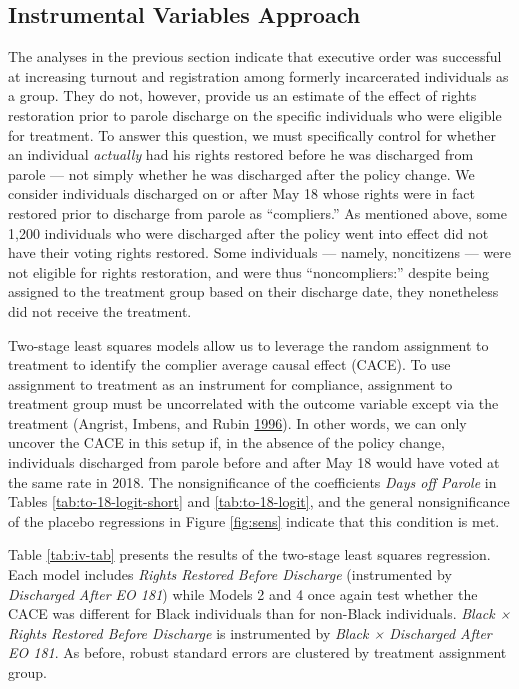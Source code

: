\documentclass[
  12pt,
]{article}
\begin{document}
\hypertarget{instrumental-variables-approach}{%
\subsection*{Instrumental Variables Approach}\label{instrumental-variables-approach}}

The analyses in the previous section indicate that executive order was successful at increasing turnout and registration among formerly incarcerated individuals as a group. They do not, however, provide us an estimate of the effect of rights restoration prior to parole discharge on the specific individuals who were eligible for treatment. To answer this question, we must specifically control for whether an individual \emph{actually} had his rights restored before he was discharged from parole --- not simply whether he was discharged after the policy change. We consider individuals discharged on or after May 18 whose rights were in fact restored prior to discharge from parole as ``compliers.'' As mentioned above, some 1,200 individuals who were discharged after the policy went into effect did not have their voting rights restored. Some individuals --- namely, noncitizens --- were not eligible for rights restoration, and were thus ``noncompliers:'' despite being assigned to the treatment group based on their discharge date, they nonetheless did not receive the treatment.

Two-stage least squares models allow us to leverage the random assignment to treatment to identify the complier average causal effect (CACE). To use assignment to treatment as an instrument for compliance, assignment to treatment group must be uncorrelated with the outcome variable except via the treatment (Angrist, Imbens, and Rubin \protect\hyperlink{ref-Angrist1996}{1996}). In other words, we can only uncover the CACE in this setup if, in the absence of the policy change, individuals discharged from parole before and after May 18 would have voted at the same rate in 2018. The nonsignificance of the coefficients \emph{Days off Parole} in Tables \ref{tab:to-18-logit-short} and \ref{tab:to-18-logit}, and the general nonsignificance of the placebo regressions in Figure \ref{fig:sens} indicate that this condition is met.

Table \ref{tab:iv-tab} presents the results of the two-stage least squares regression. Each model includes \emph{Rights Restored Before Discharge} (instrumented by \emph{Discharged After EO 181}) while Models 2 and 4 once again test whether the CACE was different for Black individuals than for non-Black individuals. \emph{Black × Rights Restored Before Discharge} is instrumented by \emph{Black × Discharged After EO 181}. As before, robust standard errors are clustered by treatment assignment group.
\end{document}
